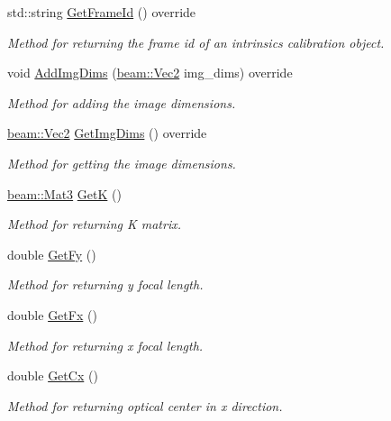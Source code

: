 \begin{DoxyCompactItemize}
std\+::string \hyperlink{classbeam__calibration_1_1_pinhole_aa776bdaf5ced5d79175303ad2fa5e281}{Get\+Frame\+Id} () override
\begin{DoxyCompactList}\small\item\em Method for returning the frame id of an intrinsics calibration object. \end{DoxyCompactList}\item 
void \hyperlink{classbeam__calibration_1_1_pinhole_a1c4f6b9c07d9b4b99980daa540a7598e}{Add\+Img\+Dims} (\hyperlink{group__utils_ga6112bda54e53755ab14060144285c6b0}{beam\+::\+Vec2} img\+\_\+dims) override
\begin{DoxyCompactList}\small\item\em Method for adding the image dimensions. \end{DoxyCompactList}\item 
\hyperlink{group__utils_ga6112bda54e53755ab14060144285c6b0}{beam\+::\+Vec2} \hyperlink{classbeam__calibration_1_1_pinhole_a66f72fdaac253195585aa121a37f312e}{Get\+Img\+Dims} () override
\begin{DoxyCompactList}\small\item\em Method for getting the image dimensions. \end{DoxyCompactList}\item 
\hyperlink{group__utils_ga665fed2673de952d12b19351a2bdb961}{beam\+::\+Mat3} \hyperlink{classbeam__calibration_1_1_pinhole_a0d004fb525f086ccc9cb46822fbe5c4e}{GetK} ()
\begin{DoxyCompactList}\small\item\em Method for returning K matrix. \end{DoxyCompactList}\item 
double \hyperlink{classbeam__calibration_1_1_pinhole_a75f59db7472104970ec6063989c5d2ad}{Get\+Fy} ()
\begin{DoxyCompactList}\small\item\em Method for returning y focal length. \end{DoxyCompactList}\item 
double \hyperlink{classbeam__calibration_1_1_pinhole_afdf888a775d106d6a618c0a93b6f1109}{Get\+Fx} ()
\begin{DoxyCompactList}\small\item\em Method for returning x focal length. \end{DoxyCompactList}\item 
double \hyperlink{classbeam__calibration_1_1_pinhole_ae76ebf82800677949ba90179393eeefa}{Get\+Cx} ()
\begin{DoxyCompactList}\small\item\em Method for returning optical center in x direction. \end{DoxyCompactList}\item 

\end{DoxyCompactItemize}
